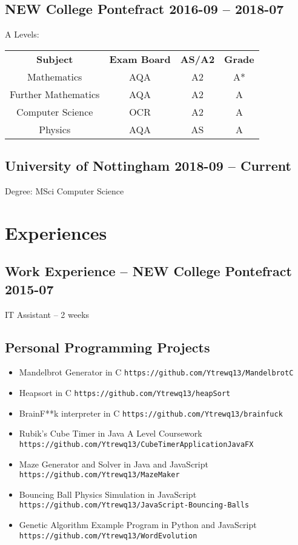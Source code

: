 \documentclass[9pt]{extarticle}
\begin{document}
    \subsection{NEW College Pontefract
    \hfill 2016-09 -- 2018-07}
    A Levels:
    \begin{tabular}{cccc}
        \textbf{Subject} & \textbf{Exam Board} & \textbf{AS/A2} & \textbf{Grade} \\
        Mathematics & AQA & A2 & A* \\
        Further Mathematics & AQA & A2 & A \\
        Computer Science & OCR & A2 & A \\
        Physics & AQA & AS & A
    \end{tabular}
    \subsection{University of Nottingham
    \hfill 2018-09 -- Current}
    Degree: MSci Computer Science
    \section{Experiences}
    \subsection{Work Experience -- NEW College Pontefract
    \hfill 2015-07}
    IT Assistant
    --
    2 weeks
    \subsection{Personal Programming Projects}
    \begin{itemize}
        \item Mandelbrot Generator in C
            \hfill
            \texttt{https://github.com/Ytrewq13/MandelbrotC}
        \item Heapsort in C
            \hfill
            \texttt{https://github.com/Ytrewq13/heapSort}
        \item BrainF**k interpreter in C
            \hfill
            \texttt{https://github.com/Ytrewq13/brainfuck}
        \item Rubik's Cube Timer in Java
            \hfill
            A Level Coursework
            \hfill
            \texttt{https://github.com/Ytrewq13/CubeTimerApplicationJavaFX}
        \item Maze Generator and Solver in Java and JavaScript
            \hfill
            \texttt{https://github.com/Ytrewq13/MazeMaker}
        \item Bouncing Ball Physics Simulation in JavaScript
            \hfill
            \texttt{https://github.com/Ytrewq13/JavaScript-Bouncing-Balls}
        \item Genetic Algorithm Example Program in Python and JavaScript
            \hfill
            \texttt{https://github.com/Ytrewq13/WordEvolution}
    \end{itemize}
\end{document}
